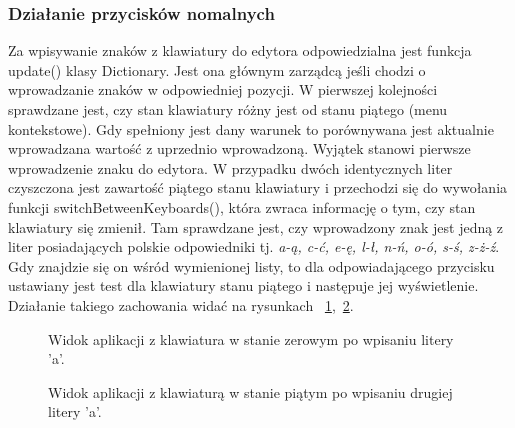 \documentclass[twoside,a4paper]{book}
\begin{document}
\subsubsection{Działanie przycisków nomalnych}
Za wpisywanie znaków z klawiatury do edytora odpowiedzialna jest funkcja \-update() klasy Dictionary. Jest ona głównym zarządcą jeśli chodzi o wprowadzanie znaków w odpowiedniej pozycji. W pierwszej kolejności sprawdzane jest, czy stan klawiatury różny jest od stanu piątego (menu kontekstowe). Gdy spełniony jest dany warunek to porównywana jest aktualnie wprowadzana wartość z u\-prze\-dnio wprowadzoną. Wyjątek stanowi pierwsze wprowadzenie znaku do e\-dy\-to\-ra. W przypadku dwóch identycznych liter czyszczona jest zawartość piątego stanu klawiatury i przechodzi się do wywołania funkcji switchBetweenKeyboards(), która zwraca informację o tym, czy stan kla\-wia\-tu\-ry się zmienił. Tam sprawdzane jest, czy wprowadzony znak jest jedną z liter posiadających polskie odpo\-wie\-dni\-ki tj. \textit{a-ą, c-ć, e-ę, l-ł, n-ń, o-ó, s-ś, z-ż-ź}. Gdy znajdzie się on wśród wymienionej listy, to dla odpowiadającego przycisku ustawiany jest test dla klawiatury stanu piątego i następuje jej wyświetlenie. Działanie takiego zachowania widać na rysunkach 
 ~\ref{fig:startA},~\ref{fig:doubleA}.
\begin{figure}
		\centering
		\caption{Widok aplikacji z klawiatura w stanie zerowym po wpisaniu litery 'a'.}
		\label{fig:startA}
\end{figure}
\begin{figure}
		\centering
		\caption{Widok aplikacji z klawiaturą w stanie piątym po wpisaniu drugiej litery 'a'.}
		\label{fig:doubleA}
\end{figure}\\
\end{document}
